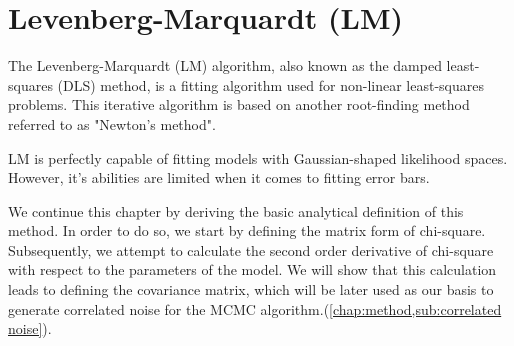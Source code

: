 \documentclass[12pt, TexShade, letterpaper]{report}
\begin{document}
\section{Levenberg-Marquardt (LM)}
\label{chap:method,sub:LM}
The Levenberg-Marquardt (LM) algorithm, also known as the damped least-squares (DLS) method, is a fitting algorithm used for non-linear least-squares problems. This iterative algorithm is based on another root-finding method referred to as "Newton's method".\par
LM is perfectly capable of fitting models with Gaussian-shaped likelihood spaces. However, it's abilities are limited when it comes to fitting error bars.\par
We continue this chapter by deriving the basic analytical definition of this method. In order to do so, we start by defining the matrix form of chi-square. Subsequently, we attempt to calculate the second order derivative of chi-square with respect to the parameters of the model. We will show that this calculation leads to defining the covariance matrix, which will be later used as our basis to generate correlated noise for the MCMC algorithm.(\ref{chap:method,sub:correlated noise}).\par
\end{document}

